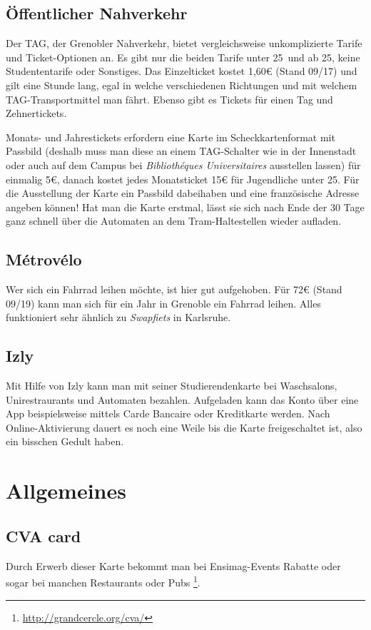 \documentclass[11pt,a4paper]{article}
\begin{document}
	\subsection{Öffentlicher Nahverkehr}
	
	Der TAG, der Grenobler Nahverkehr, bietet vergleichsweise unkomplizierte Tarife und Ticket-Optionen an. Es gibt nur die beiden Tarife \glqq unter 25\grqq\ und \glqq ab 25\grqq , keine Studententarife oder Sonstiges. Das Einzelticket kostet 1,60€ (Stand 09/17) und gilt eine Stunde lang, egal in welche verschiedenen Richtungen und mit welchem TAG-Transportmittel man fährt. Ebenso gibt es Tickets für einen Tag und Zehnertickets.
	
	Monats- und Jahrestickets erfordern eine Karte im Scheckkartenformat mit Passbild (deshalb muss man diese an einem TAG-Schalter wie in der Innenstadt oder auch auf dem Campus bei \emph{Bibliothéques Universitaires} ausstellen lassen) für einmalig 5€, danach kostet jedes Monatsticket 15€ für Jugendliche unter 25. Für die Ausstellung der Karte ein Passbild dabeihaben und eine französische Adresse angeben können! Hat man die Karte erstmal, lässt sie sich nach Ende der 30 Tage ganz schnell über die Automaten an dem Tram-Haltestellen wieder aufladen.

  \subsection{Métrovélo}
  Wer sich ein Fahrrad leihen möchte, ist hier gut aufgehoben. Für 72€ (Stand 09/19) kann man sich für ein Jahr in Grenoble ein Fahrrad leihen. Alles funktioniert sehr ähnlich zu \textit{Swapfiets} in Karlsruhe.
	
	\subsection{Izly}
  Mit Hilfe von Izly kann man mit seiner Studierendenkarte bei Waschsalons, Unirestraurants und Automaten bezahlen. Aufgeladen kann das Konto über eine App beispielsweise mittels Carde Bancaire oder Kreditkarte werden. Nach Online-Aktivierung dauert es noch eine Weile bis die Karte freigeschaltet ist, also ein bisschen Gedult haben.


  \section{Allgemeines}
  \subsection{CVA card}
  Durch Erwerb dieser Karte bekommt man bei Ensimag-Events Rabatte oder sogar bei manchen Restaurants oder Pubs \footnote{\url{http://grandcercle.org/cva/}}.
\end{document}
